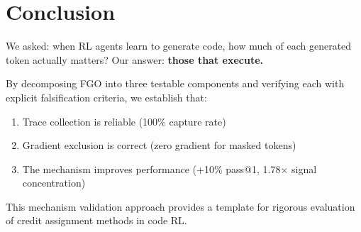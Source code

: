 \section{Conclusion}

We asked: when RL agents learn to generate code, how much of each generated token actually matters? Our answer: \textbf{those that execute.}

By decomposing FGO into three testable components and verifying each with explicit falsification criteria, we establish that:

\begin{enumerate}
    \item Trace collection is reliable (100\% capture rate)
    \item Gradient exclusion is correct (zero gradient for masked tokens)
    \item The mechanism improves performance (+10\% pass@1, 1.78$\times$ signal concentration)
\end{enumerate}

This mechanism validation approach provides a template for rigorous evaluation of credit assignment methods in code RL.
